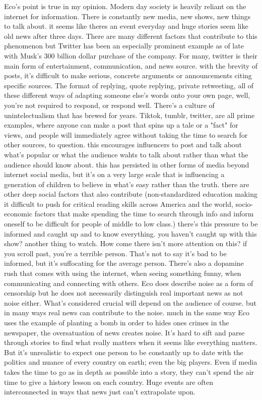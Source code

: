 \documentclass{article}
\begin{document}
Eco's point is true in my opinion. Modern day society is heavily reliant on the internet for information. There is constantly new media, new shows, new things to talk about. it seems like theres an event everyday and huge stories seem like old news after three days. There are many different factors that contribute to this phenomenon but Twitter has been an especially prominent example as of late with Musk's 300 billion dollar purchase of the company. For many, twitter is their main form of entertainment, communication, and news source. with the brevity of posts, it's difficult to make serious, concrete arguments or announcements citing specific sources. The format of replying, quote replying, private retweeting, all of these different ways of adapting someone else's words onto your own page, well, you're not required to respond, or respond well. There's a culture of unintelectualism that has brewed for years. Tiktok, tumblr, twitter, are all prime examples, where anyone can make a post that spins up a tale or a "fact" for views, and people will immediately agree without taking the time to search for other sources, to question. this encourages influencers to post and talk about what's popular or what the audience wahts to talk about rather than what the audience should know about. this has persisted in other forms of media beyond internet social media, but it's on a very large scale that is influencing a generation of children to believe in what's easy rather than the truth.
there are other deep social factors that also contribute (non-standardized education making it difficult to push for critical reading skills across America and the world, socio-economic factors that make spending the time to search through info and inform oneself to be difficult for people of middle to low class.) there's this pressure to be informed and caught up and to know everything. you haven't caught up with this show? another thing to watch. How come there isn't more attention on this? if you scroll past, you're a terrible person. That's not to say it's bad to be informed, but it's suffocating for the average person. There's also a dopamine rush that comes with using the internet, when seeing something funny, when communicating and connecting with others. Eco does describe noise as a form of censorship but he does not necessarily distinguish real important news as not noise either. What's considered crucial will depend on the audience of course. but in many ways real news can contribute to the noise. much in the same way Eco uses the example of planting a bomb in order to hides ones crimes in the newspaper, the oversatuation of news creates noise. It's hard to sift and parse through stories to find what really matters when it seems like everything matters. But it's unrealistic to expect one person to be constantly up to date with the politics and nuance of every country on earth; even the big players. Even if media takes the time to go as in depth as possible into a story, they can't spend the air time to give a history lesson on each country. Huge events are often interconnected in ways that news just can't extrapolate upon.
\end{document}

